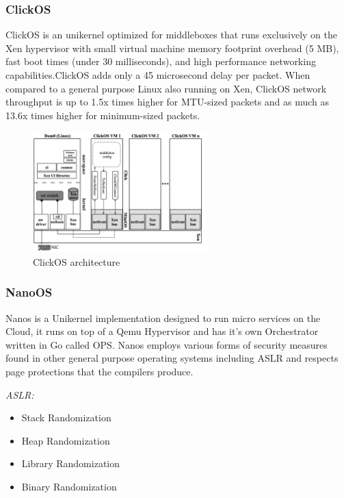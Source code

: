 \subsubsection{ClickOS \cite{ClickOS}}
ClickOS is an unikernel optimized for middleboxes that runs exclusively on
the Xen hypervisor with small virtual machine memory footprint overhead
(5 MB), fast boot times (under 30 milliseconds), and high performance
networking capabilities.ClickOS adds only a 45 microsecond delay per
packet. When compared to a general purpose Linux also running on Xen,
ClickOS network throughput is up to 1.5x times higher for MTU-sized packets
and as much as 13.6x times higher for minimum-sized packets. 

\begin{figure}[htbp!] 
  \centering    
  \includegraphics[width=0.6\textwidth]{ClickOSStack}
  \caption[ClickOS]{ClickOS architecture \cite{ClickOS}}
  \label{fig:ClickOSStack}
  \end{figure}

\subsubsection{NanoOS \cite{NanoOS}}
Nanos is a Unikernel implementation designed to run micro services on the 
Cloud, it runs on top of a Qemu Hypervisor and has it's own Orchestrator 
written in Go called OPS. 
Nanos employs various forms of security measures found in other general purpose operating systems including ASLR and respects page protections 
that the compilers produce.

\emph{ASLR:}

\begin{itemize}
  \item Stack Randomization
  \item Heap Randomization
  \item Library Randomization
  \item Binary Randomization
\end{itemize}

